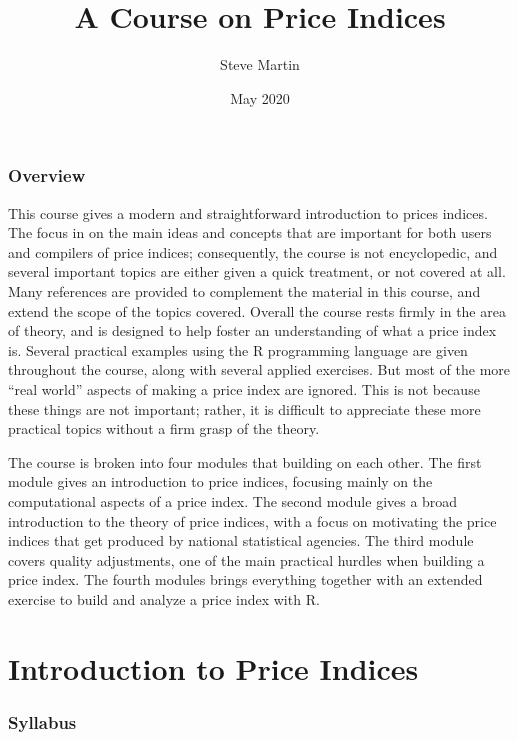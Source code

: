 \documentclass[]{article}
\title{A Course on Price Indices}
\author{Steve Martin}
\date{May 2020}
\begin{document}
\maketitle

{
\setcounter{tocdepth}{2}
\tableofcontents
}
\hypertarget{overview}{%
\section*{Overview}\label{overview}}

This course gives a modern and straightforward introduction to prices indices. The focus in on the main ideas and concepts that are important for both users and compilers of price indices; consequently, the course is not encyclopedic, and several important topics are either given a quick treatment, or not covered at all. Many references are provided to complement the material in this course, and extend the scope of the topics covered. Overall the course rests firmly in the area of theory, and is designed to help foster an understanding of what a price index is. Several practical examples using the R programming language are given throughout the course, along with several applied exercises. But most of the more ``real world'' aspects of making a price index are ignored. This is not because these things are not important; rather, it is difficult to appreciate these more practical topics without a firm grasp of the theory.

The course is broken into four modules that building on each other. The first module gives an introduction to price indices, focusing mainly on the computational aspects of a price index. The second module gives a broad introduction to the theory of price indices, with a focus on motivating the price indices that get produced by national statistical agencies. The third module covers quality adjustments, one of the main practical hurdles when building a price index. The fourth modules brings everything together with an extended exercise to build and analyze a price index with R.

\hypertarget{part-introduction-to-price-indices}{%
\part{Introduction to Price Indices}\label{part-introduction-to-price-indices}}

\hypertarget{syllabus}{%
\section{Syllabus}\label{syllabus}}
\end{document}
